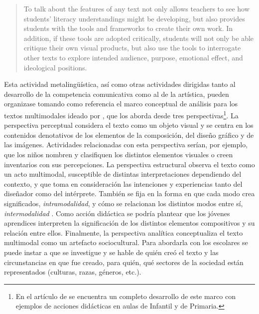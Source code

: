 \documentclass[spanish]{textolivre}
\begin{document}
\begin{quote}
    To talk about the features of any text not only allows teachers to see how students’ literacy understandings might be developing, but also provides students with the tools and frameworks to create their own work. In addition, if these tools are adopted critically, students will not only be able critique their own visual products, but also use the tools to interrogate other texts to explore intended audience, purpose, emotional effect, and ideological positions.
\end{quote}

Esta actividad metalingüística, así como otras actividades dirigidas tanto al desarrollo de la competencia comunicativa como al de la artística, pueden organizase tomando como referencia el marco conceptual de análisis para los textos multimodales ideado por \textcite{serafini_multimodal_2015}, que los aborda desde tres perspectivas\footnote{En el artículo de \textcite{serafini_multimodal_2015} se encuentra un completo desarrollo de este marco con ejemplos de acciones didácticas en aulas de Infantil y de Primaria.}. La perspectiva perceptual considera el texto como un objeto visual y se centra en los contenidos denotativos de los elementos de la composición, del diseño gráfico y de las imágenes. Actividades relacionadas con esta perspectiva serían, por ejemplo, que los niños nombren y clasifiquen los distintos elementos visuales o creen inventarios con sus percepciones. La perspectiva estructural observa el texto como un acto multimodal, susceptible de distintas interpretaciones dependiendo del contexto, y que toma en consideración las intenciones y experiencias tanto del diseñador como del intérprete. También se fija en la forma en que cada modo crea significados, \textit{intramodalidad}, y cómo se relacionan los distintos modos entre sí, \textit{intermodalidad} \cite{unsworth_towards_2006}. Como acción didáctica se podría plantear que los jóvenes aprendices interpreten la significación de los distintos elementos compositivos y su relación entre ellos. Finalmente, la perspectiva analítica conceptualiza el texto multimodal como un artefacto sociocultural. Para abordarla con los escolares se puede instar a que se investigue y se hable de quién creó el texto y las circunstancias en que fue creado, para quién, qué sectores de la sociedad están representados (culturas, razas, géneros, etc.).
\end{document}

